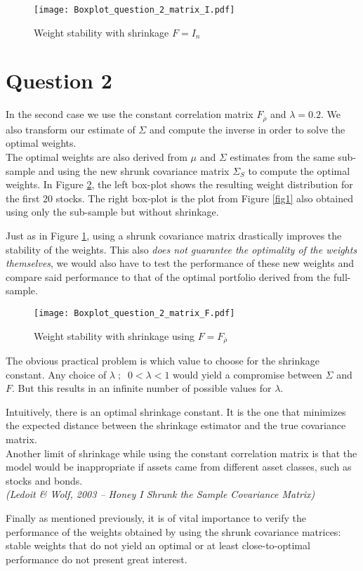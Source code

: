 \begin{figure}[H]
\texttt{[image: Boxplot\_question\_2\_matrix\_I.pdf]}
\caption{Weight stability with shrinkage $F=I_n$}
\label{fig2}
\end{figure}

\section*{Question 2}

In the second case we use the constant correlation matrix $F_{\overline{\rho}}$ and $\lambda=0.2$. We also transform our estimate of $\Sigma$ and compute the inverse in order to solve the optimal weights. \\
The optimal weights are also derived from $\mu$ and $\Sigma$ estimates from the same sub-sample and using the new shrunk covariance matrix $\Sigma_S$ to compute the optimal weights. In Figure \ref{fig3}, the left box-plot shows the resulting weight distribution for the first 20 stocks. The right box-plot is the plot from Figure \ref{fig1} also obtained using only the sub-sample but without shrinkage. \par\smallskip
Just as in Figure \ref{fig2}, using a shrunk covariance matrix drastically improves the stability of the weights. This also \emph{does not guarantee the optimality of the weights themselves}, we would also have to test the performance of these new weights and compare said performance to that of the optimal portfolio derived from the full-sample.

\begin{figure}[H]
\texttt{[image: Boxplot\_question\_2\_matrix\_F.pdf]}
\caption{Weight stability with shrinkage using $F=F_{\overline{\rho}}$}
\label{fig3}
\end{figure}

The obvious practical problem is which value to choose for the shrinkage constant. Any choice of $\lambda\;;\;\;0<\lambda<1$ would yield a compromise between $\Sigma$ and $F$. But this results in an infinite number of possible values for $\lambda$. 
\par\smallskip
Intuitively, there is an optimal shrinkage constant. It is the one that minimizes the expected distance between the shrinkage estimator and the true covariance matrix. \\
Another limit of shrinkage while using the constant correlation matrix is that the model would be inappropriate if assets came from different asset classes, such as stocks and bonds. \smallskip \\
\textit{(Ledoit \& Wolf, 2003 – Honey I Shrunk the Sample Covariance Matrix)}
\par\smallskip
Finally as mentioned previously, it is of vital importance to verify the performance of the weights obtained by using the shrunk covariance matrices: stable weights that do not yield an optimal or at least close-to-optimal performance do not present great interest.
